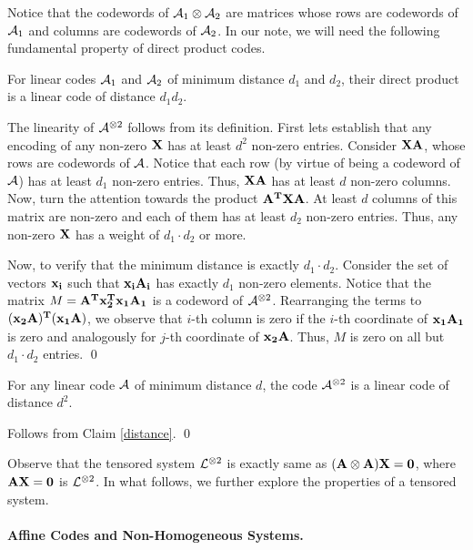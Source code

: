 {Notice that the codewords of ${\cal A}_1 \otimes {\cal A}_2$ are matrices whose
rows are codewords of ${\cal A}_1$ and columns are codewords of ${\cal A}_2$. In
our note, we will need the following fundamental property of direct
product codes.

\begin{claim} \label{distance} For linear codes ${\cal A}_1$ and ${\cal A}_2$ of
  minimum distance $d_1$ and $d_2$, their direct product is a linear
  code of distance $d_1d_2$.
\end{claim}
 The linearity of ${\cal A}^{\otimes 2}$ follows from
its definition.  First lets establish that any encoding of any
non-zero ${\bf X}$ has at least $d^2$ non-zero entries.  Consider
${\bf XA}$, whose rows are codewords of ${\cal A}$. Notice that each row (by
virtue of being a codeword of ${\cal A}$) has at least $d_1$ non-zero
entries. Thus, ${\bf XA}$ has at least $d$ non-zero columns.  Now,
turn the attention towards the product ${\bf A^{T}XA}$. At least $d$
columns of this matrix are non-zero and each of them has at least
$d_2$ non-zero entries. Thus, any non-zero ${\bf X}$ has a weight of
$d_1\cdot d_2$ or more.

Now, to verify that the minimum distance is exactly $d_1 \cdot
d_2$. Consider the set of vectors ${\bf x_i}$ such that ${\bf x_iA_i}$
has exactly $d_1$ non-zero elements. Notice that the matrix $M = {\bf
  A^{T}x_{2}^{T}x_1A_1}$ is a codeword of ${\cal A}^{\otimes
  2}$. Rearranging the terms to ${\bf (x_{2}A)^{T}(x_1A)}$, we observe
that $i$-th column is zero if the $i$-th coordinate of ${\bf x_1A_1}$
is zero and analogously for $j$-th coordinate of ${\bf x_2A}$. Thus,
$M$ is zero on all but $d_1 \cdot d_2$ entries. \qed



\begin{corollary}
  For any linear code ${\cal A}$ of minimum distance $d$, the code
  ${\cal A}^{\otimes 2}$ is a linear code of distance $d^2$.
\end{corollary}
 Follows from Claim \ref{distance}. \qed

Observe that the tensored system ${\cal L}^{\otimes 2}$ is exactly same as
$({\bf A} \otimes {\bf A}) {\bf X} = {\bf 0}$, where ${\bf AX = 0}$ is
${\cal L}^{\otimes 2}$.  In what follows, we further explore the properties
of a tensored system.

\paragraph{Affine Codes and Non-Homogeneous Systems.}

}
